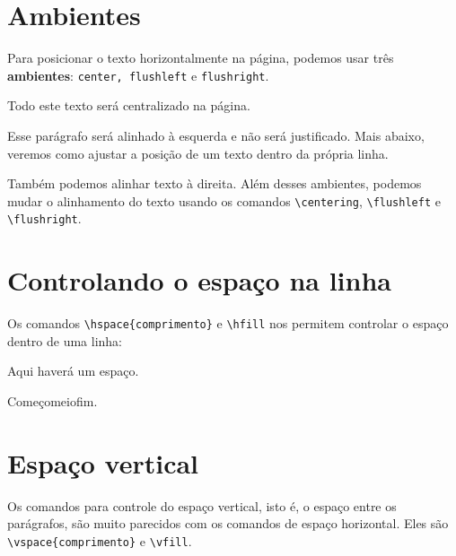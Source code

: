 \documentclass[a4paper,oneside]{article}
\begin{document}
\frenchspacing

\section{Ambientes}

Para posicionar o texto horizontalmente na página, podemos usar três
\textbf{ambientes}: \texttt{center, flushleft} e \texttt{flushright}.

\begin{center}
  Todo este texto será centralizado na página.
\end{center}

\begin{flushleft}
  Esse parágrafo será alinhado à esquerda e não será justificado. Mais abaixo,
  veremos como ajustar a posição de um texto dentro da própria linha.
\end{flushleft}

\begin{flushright}
  Também podemos alinhar texto à direita. Além desses ambientes, podemos mudar
  o alinhamento do texto usando os comandos \verb+\centering+,
  \verb+\flushleft+ e \verb+\flushright+.
\end{flushright}

\section{Controlando o espaço na linha}

Os comandos \verb+\hspace{comprimento}+ e \verb+\hfill+ nos permitem controlar
o espaço dentro de uma linha:

Aqui haverá\hspace{1.5cm} um espaço.

Começo\hfill meio\hfill fim.

\section{Espaço vertical}

Os comandos para controle do espaço vertical, isto é, o espaço entre os
parágrafos, são muito parecidos com os comandos de espaço horizontal. Eles são
\verb+\vspace{comprimento}+ e \verb+\vfill+.
\end{document}

